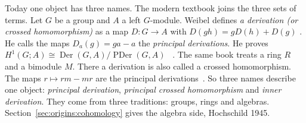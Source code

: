 Today one object has three names. The modern textbook joins the three sets of terms. Let $G$ be a group and $A$
a left $G$-module. Weibel defines \emph{a derivation (or crossed
homomorphism)} as a map $D\colon G \to A$ with $D(gh) = gD(h) + D(g)$ \cite[Definition~6.4.1, p.~174]{Weibel1994}. He
calls the maps $D_a(g) = ga - a$ the \emph{principal derivations}. He proves
$H^1(G;A) \cong \operatorname{Der}(G,A)/\operatorname{PDer}(G,A)$%
~\cite[Definition~6.4.1, Example~6.4.2, Theorem~6.4.5]{Weibel1994}. The same
book treats a ring $R$ and a bimodule $M$. There a derivation is also called a
crossed homomorphism. The maps $r \mapsto rm - mr$ are the principal
derivations~\cite[\S 9.2, p.~301]{Weibel1994}. So three names describe one
object: \emph{principal derivation}, \emph{principal crossed homomorphism} and
\emph{inner derivation}. They come from three traditions: groups, rings and
algebras. Section~\ref{sec:origins:cohomology} gives the algebra side,
Hochschild 1945.
